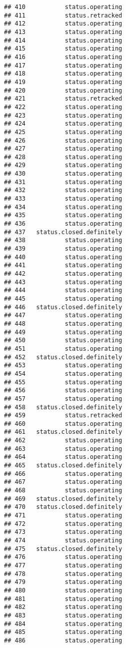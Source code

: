 \documentclass[
]{article}
\begin{document}
\begin{verbatim}
## 410           status.operating
## 411           status.retracked
## 412           status.operating
## 413           status.operating
## 414           status.operating
## 415           status.operating
## 416           status.operating
## 417           status.operating
## 418           status.operating
## 419           status.operating
## 420           status.operating
## 421           status.retracked
## 422           status.operating
## 423           status.operating
## 424           status.operating
## 425           status.operating
## 426           status.operating
## 427           status.operating
## 428           status.operating
## 429           status.operating
## 430           status.operating
## 431           status.operating
## 432           status.operating
## 433           status.operating
## 434           status.operating
## 435           status.operating
## 436           status.operating
## 437   status.closed.definitely
## 438           status.operating
## 439           status.operating
## 440           status.operating
## 441           status.operating
## 442           status.operating
## 443           status.operating
## 444           status.operating
## 445           status.operating
## 446   status.closed.definitely
## 447           status.operating
## 448           status.operating
## 449           status.operating
## 450           status.operating
## 451           status.operating
## 452   status.closed.definitely
## 453           status.operating
## 454           status.operating
## 455           status.operating
## 456           status.operating
## 457           status.operating
## 458   status.closed.definitely
## 459           status.retracked
## 460           status.operating
## 461   status.closed.definitely
## 462           status.operating
## 463           status.operating
## 464           status.operating
## 465   status.closed.definitely
## 466           status.operating
## 467           status.operating
## 468           status.operating
## 469   status.closed.definitely
## 470   status.closed.definitely
## 471           status.operating
## 472           status.operating
## 473           status.operating
## 474           status.operating
## 475   status.closed.definitely
## 476           status.operating
## 477           status.operating
## 478           status.operating
## 479           status.operating
## 480           status.operating
## 481           status.operating
## 482           status.operating
## 483           status.operating
## 484           status.operating
## 485           status.operating
## 486           status.operating

\end{verbatim}
\end{document}
